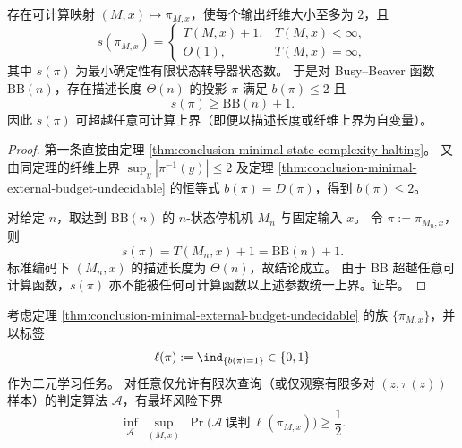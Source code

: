 \begin{corollary}\label{cor:conclusion-bounded-fiber-unbounded-state-busybeaver}
存在可计算映射 \((M,x)\mapsto \pi_{M,x}\)，使每个输出纤维大小至多为 \(2\)，且
\[
s(\pi_{M,x})=
\begin{cases}
T(M,x)+1,& T(M,x)<\infty,\\
O(1),& T(M,x)=\infty,
\end{cases}
\]
其中 \(s(\pi)\) 为最小确定性有限状态转导器状态数。
于是对 Busy--Beaver 函数 \(\mathrm{BB}(n)\)，存在描述长度 \(\Theta(n)\) 的投影 \(\pi\) 满足 \(b(\pi)\le 2\) 且
\[
s(\pi)\ge \mathrm{BB}(n)+1.
\]
因此 \(s(\pi)\) 可超越任意可计算上界（即便以描述长度或纤维上界为自变量）。
\end{corollary}

\begin{proof}
第一条直接由定理 \ref{thm:conclusion-minimal-state-complexity-halting}。
又由同定理的纤维上界 \(\sup_y|\pi^{-1}(y)|\le 2\) 及定理 \ref{thm:conclusion-minimal-external-budget-undecidable} 的恒等式 \(b(\pi)=D(\pi)\)，得到 \(b(\pi)\le 2\)。

对给定 \(n\)，取达到 \(\mathrm{BB}(n)\) 的 \(n\)-状态停机机 \(M_n\) 与固定输入 \(x\)。
令 \(\pi:=\pi_{M_n,x}\)，则
\[
s(\pi)=T(M_n,x)+1=\mathrm{BB}(n)+1.
\]
标准编码下 \((M_n,x)\) 的描述长度为 \(\Theta(n)\)，故结论成立。
由于 \(\mathrm{BB}\) 超越任意可计算函数，\(s(\pi)\) 亦不能被任何可计算函数以上述参数统一上界。证毕。
\end{proof}

\begin{theorem}\label{thm:conclusion-ml-finite-sample-nongeneralization-budget}
考虑定理 \ref{thm:conclusion-minimal-external-budget-undecidable} 的族 \(\{\pi_{M,x}\}\)，并以标签
\[
\ell(\pi):=\ind_{\{b(\pi)=1\}}\in\{0,1\}
\]
作为二元学习任务。
对任意仅允许有限次查询（或仅观察有限多对 \((z,\pi(z))\) 样本）的判定算法 \(\mathcal A\)，有最坏风险下界
\[
\inf_{\mathcal A}\ \sup_{(M,x)}\ \Pr\!\bigl(\mathcal A\ \text{误判}\ \ell(\pi_{M,x})\bigr)\ge \frac12.
\]
\end{theorem}


